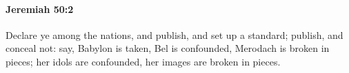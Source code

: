 
		\paragraph{Jeremiah 50:2} %
			\label{JEREMIAH-50-2}

			Declare ye among the nations, and publish, and set up a standard; publish, and conceal not: say, Babylon is taken, Bel is confounded, Merodach is broken in pieces; her idols are confounded, her images are broken in pieces.


